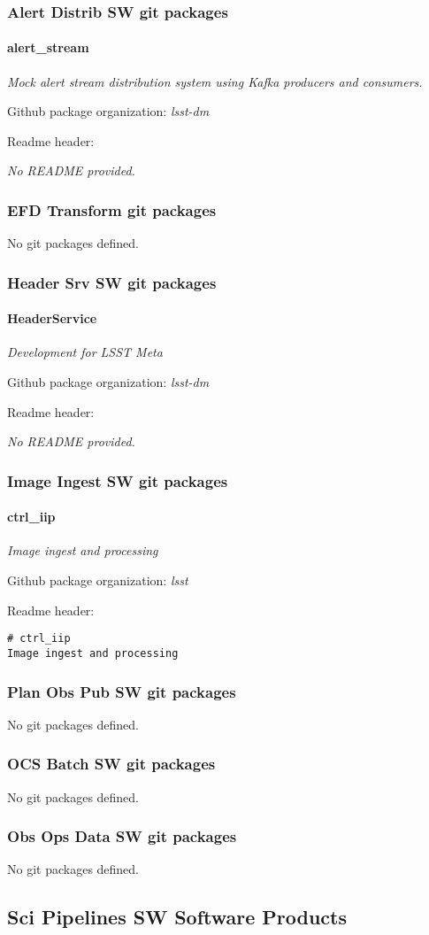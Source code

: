 \subsubsection{Alert Distrib SW git packages}
\paragraph{alert\_stream}
\textit{Mock alert stream distribution system using Kafka producers and
consumers.}

Github package organization: \textit{lsst-dm}

Readme header:

\textit{No README provided.}

\subsubsection{EFD Transform git packages}
No git packages defined.\subsubsection{Header Srv SW git packages}
\paragraph{HeaderService}
\textit{Development for LSST Meta}

Github package organization: \textit{lsst-dm}

Readme header:

\textit{No README provided.}

\subsubsection{Image Ingest SW git packages}
\paragraph{ctrl\_iip}
\textit{Image ingest and processing}

Github package organization: \textit{lsst}

Readme header:

\begin{verbatim}
# ctrl_iip
Image ingest and processing\end{verbatim}

\subsubsection{Plan Obs Pub SW git packages}
No git packages defined.\subsubsection{OCS Batch SW git packages}
No git packages defined.\subsubsection{Obs Ops Data SW git packages}
No git packages defined.\subsection{Sci Pipelines SW Software Products}
